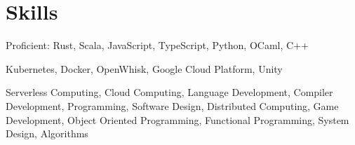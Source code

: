 \section{Skills}

%
{}%
{}%
{}%
{Proficient: Rust, Scala, JavaScript, TypeScript, Python, OCaml, C++%
%
\newline{}
}

%
{}%
{}%
{}%
{Kubernetes, Docker, OpenWhisk, Google Cloud Platform, Unity
\newline{}
}

%
{}%
{}%
{}%
{Serverless Computing, Cloud Computing, Language Development, Compiler
Development, Programming, Software Design, Distributed Computing, Game
Development, Object Oriented Programming, Functional Programming, System Design,
Algorithms
\newline{}
}